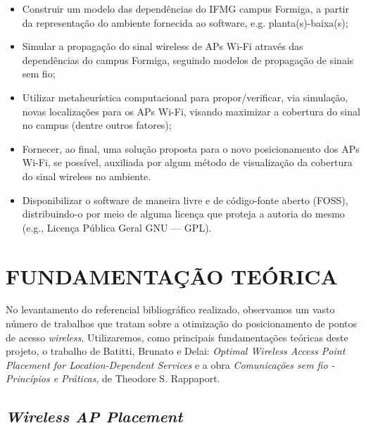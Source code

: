 \documentclass[
	12pt,				%
	openright,			%
	twoside,			%
	a4paper,			%
	english,			%
	french,				%
	spanish,			%
	brazil				%
	]{abntex2}
\begin{document}
\begin{itemize}
	\item Construir um modelo das dependências do IFMG campus Formiga, a partir da representação do ambiente fornecida ao software, e.g. planta(s)-baixa(s);
	
	\item Simular a propagação do sinal wireless de APs Wi-Fi através das dependências do campus Formiga, seguindo modelos de propagação de sinais sem fio; 

	\item Utilizar metaheurística computacional para propor/verificar, via simulação, novas localizações para os APs Wi-Fi, visando maximizar a cobertura do sinal no campus (dentre outros fatores);
	
	\item Fornecer, ao final, uma solução proposta para o novo posicionamento dos APs Wi-Fi, se possível, auxiliada por algum método de visualização da cobertura do sinal wireless no ambiente.
	
	\item Disponibilizar o software de maneira livre e de código-fonte aberto (FOSS), distribuindo-o por meio de alguma licença que proteja a autoria do mesmo (e.g., Licença Pública Geral GNU — GPL).
\end{itemize}


\chapter[FUNDAMENTAÇÃO TEÓRICA]{FUNDAMENTAÇÃO TEÓRICA}

No levantamento do referencial bibliográfico realizado, observamos um vasto número de trabalhos que tratam sobre a otimização do posicionamento de pontos de acesso \textit{wireless}. Utilizaremos, como principais fundamentações teóricas deste projeto, o trabalho de Batitti, Brunato e Delai: \textit{Optimal Wireless Access Point Placement for Location-Dependent Services} e a obra \textit{Comunicações sem fio - Princípios e Práticas}, de Theodore S. Rappaport.

\section[Wireless AP Placement]{\textit{Wireless AP Placement}}
\end{document}
